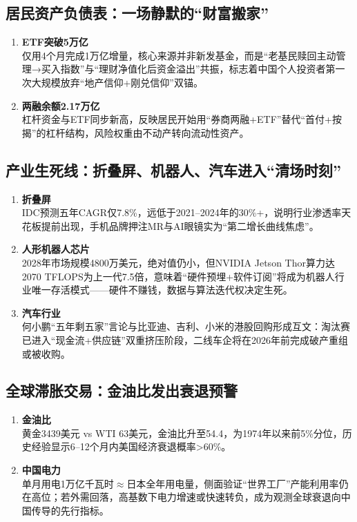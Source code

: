\subsection{居民资产负债表：一场静默的“财富搬家”}
\begin{enumerate}[leftmargin=*, nosep]
    \item \textbf{ETF突破5万亿}  \\
    {\color{red}仅用4个月完成1万亿增量，核心来源并非新发基金，而是“老基民赎回主动管理→买入指数”与“理财净值化后资金溢出”共振，标志着中国个人投资者第一次大规模放弃“地产信仰+刚兑信仰”双锚。}  
    \item \textbf{两融余额2.17万亿}  \\
    {\color{red}杠杆资金与ETF同步新高，反映居民开始用“券商两融+ETF”替代“首付+按揭”的杠杆结构，风险权重由不动产转向流动性资产。}
\end{enumerate}

\subsection{产业生死线：折叠屏、机器人、汽车进入“清场时刻”}
\begin{enumerate}[leftmargin=*, nosep]
    \item \textbf{折叠屏}  \\
    IDC预测五年CAGR仅7.8\%，远低于2021–2024年的30\%+，说明行业渗透率天花板提前出现，手机品牌押注MR与AI眼镜实为“第二增长曲线焦虑”。
    \item \textbf{人形机器人芯片}  \\
    2028年市场规模4800万美元，绝对值仍小，但NVIDIA Jetson Thor算力达2070 TFLOPS为上一代7.5倍，意味着“硬件预埋+软件订阅”将成为机器人行业唯一存活模式——{\color{red}硬件不赚钱，数据与算法迭代权决定生死}。
    \item \textbf{汽车行业}  \\
    何小鹏“五年剩五家”言论与比亚迪、吉利、小米的港股回购形成互文：淘汰赛已进入“现金流+供应链”双重挤压阶段，二线车企将在2026年前完成破产重组或被收购。
\end{enumerate}

\subsection{全球滞胀交易：金油比发出衰退预警}
\begin{enumerate}[leftmargin=*, nosep]
    \item \textbf{金油比}  \\
    黄金3439美元 vs WTI 63美元，金油比升至54.4，为1974年以来前5\%分位，历史经验显示6–12个月内美国经济衰退概率>60\%。  
    \item \textbf{中国电力}  \\
    {\color{red}单月用电1万亿千瓦时$\approx$日本全年用电量，侧面验证“世界工厂”产能利用率仍在高位；若外需回落，高基数下电力增速或快速转负，成为观测全球衰退向中国传导的先行指标。}
\end{enumerate}

